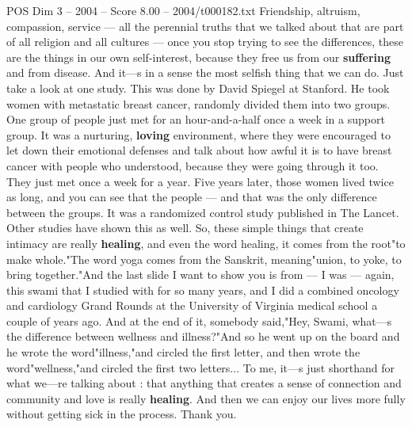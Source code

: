 \begin{textsample}{POS Dim 3 – 2004 – Score 8.00 – 2004/t000182.txt}
Friendship, altruism, compassion, service — all the perennial truths that we talked about that are part of all religion and all cultures — once you stop trying to see the differences, these are the things in our own self-interest, because they free us from our \textbf{suffering} and from disease.
And it—s in a sense the most selfish thing that we can do.
Just take a look at one study.
This was done by David Spiegel at Stanford.
He took women with metastatic breast cancer, randomly divided them into two groups.
One group of people just met for an hour-and-a-half once a week in a support group.
It was a nurturing, \textbf{loving} environment, where they were encouraged to let down their emotional defenses and talk about how awful it is to have breast cancer with people who understood, because they were going through it too.
They just met once a week for a year.
Five years later, those women lived twice as long, and you can see that the people — and that was the only difference between the groups.
It was a randomized control study published in The Lancet.
Other studies have shown this as well.
So, these simple things that create intimacy are really \textbf{healing}, and even the word healing, it comes from the root"to make whole."The word yoga comes from the Sanskrit, meaning"union, to yoke, to bring together."And the last slide I want to show you is from — I was — again, this swami that I studied with for so many years, and I did a combined oncology and cardiology Grand Rounds at the University of Virginia medical school a couple of years ago.
And at the end of it, somebody said,"Hey, Swami, what—s the difference between wellness and illness?"And so he went up on the board and he wrote the word"illness,"and circled the first letter, and then wrote the word"wellness,"and circled the first two letters...
To me, it—s just shorthand for what we—re talking about : that anything that creates a sense of connection and community and love is really \textbf{healing}.
And then we can enjoy our lives more fully without getting sick in the process.
Thank you.

\end{textsample}
